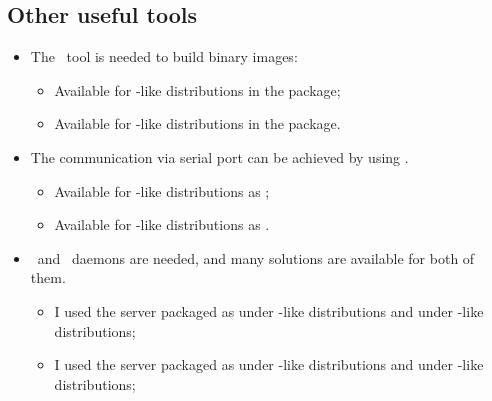 \subsection{ Other useful tools } \label{sub:OtherTools}

    \begin{itemize}

    \item  The \mkimage\ tool is needed to build binary images:

        \begin{itemize}
        \item   Available for \Debian-like distributions in the
                 package;
        \item   Available for \RedHat-like distributions in the
                 package.
        \end{itemize}

    \item   The communication via serial port can be achieved by using
            \Minicom.

        \begin{itemize}
        \item   Available for \Debian-like distributions as
                ;
        \item   Available for \RedHat-like distributions as
                .
        \end{itemize}

    \item   \BootP\ and \TFTP\ daemons are needed, and many solutions are
            available for both of them.
            \begin{itemize}
            \item   I used the server packaged as 
                    under \Debian-like distributions and 
                    under \RedHat-like distributions;
            \item   I used the server packaged as 
                    under \Debian-like distributions and 
                    under \RedHat-like distributions;
            \end{itemize}

    \end{itemize}

